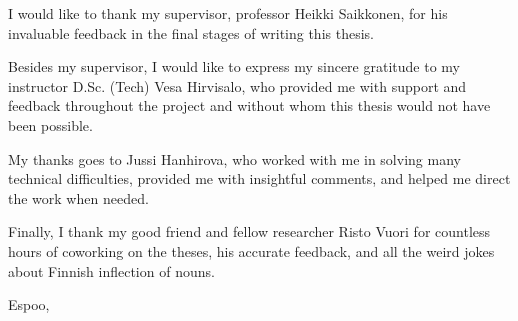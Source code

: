 I would like to thank my supervisor, professor Heikki Saikkonen, for his invaluable feedback in the final stages of writing this thesis.

Besides my supervisor, I would like to express my sincere gratitude to my instructor D.Sc. (Tech) Vesa Hirvisalo, who provided me with support and feedback throughout the project and without whom this thesis would not have been possible.

My thanks goes to Jussi Hanhirova, who worked with me in solving many technical difficulties, provided me with insightful comments, and helped me direct the work when needed.

Finally, I thank my good friend and fellow researcher Risto Vuori for countless hours of coworking on the theses, his accurate feedback, and all the weird jokes about Finnish inflection of nouns.

\vskip 10mm

\noindent Espoo, \DATE
\vskip 5mm
\noindent\AUTHOR

